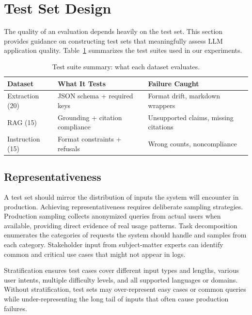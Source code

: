 
\section{Test Set Design}
\label{sec:testset-design}

The quality of an evaluation depends heavily on the test set. This section provides guidance on constructing test sets that meaningfully assess LLM application quality. Table~\ref{tab:dataset-summary} summarizes the test suites used in our experiments.

\begin{table}[h]
\centering
\caption{Test suite summary: what each dataset evaluates.}
\label{tab:dataset-summary}
\begin{tabular}{@{}lp{4cm}p{4cm}@{}}
\toprule
\textbf{Dataset} & \textbf{What It Tests} & \textbf{Failure Caught} \\
\midrule
Extraction (20) & JSON schema + required keys & Format drift, markdown wrappers \\
RAG (15) & Grounding + citation compliance & Unsupported claims, missing citations \\
Instruction (15) & Format constraints + refusals & Wrong counts, noncompliance \\
\bottomrule
\end{tabular}
\end{table}

\subsection{Representativeness}

A test set should mirror the distribution of inputs the system will encounter in production. Achieving representativeness requires deliberate sampling strategies. Production sampling collects anonymized queries from actual users when available, providing direct evidence of real usage patterns. Task decomposition enumerates the categories of requests the system should handle and samples from each category. Stakeholder input from subject-matter experts can identify common and critical use cases that might not appear in logs.

Stratification ensures test cases cover different input types and lengths, various user intents, multiple difficulty levels, and all supported languages or domains. Without stratification, test sets may over-represent easy cases or common queries while under-representing the long tail of inputs that often cause production failures.

